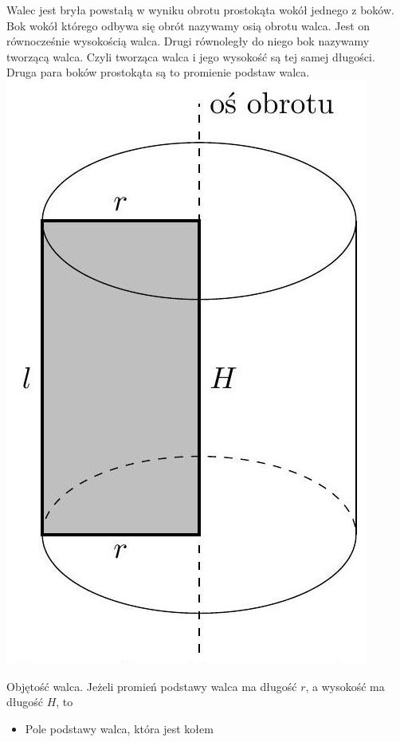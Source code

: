 \documentclass[10pt]{article}
\begin{document}
Walec jest bryła powstałą w wyniku obrotu prostokąta wokół jednego z boków. Bok wokół którego odbywa się obrót nazywamy osią obrotu walca. Jest on równocześnie wysokością walca. Drugi równoległy do niego bok nazywamy tworzącą walca. Czyli tworząca walca i jego wysokość są tej samej długości. Druga para boków prostokąta są to promienie podstaw walca.\\
\includegraphics[max width=\textwidth, center]{2024_11_21_e9b4faa005d5be2cc318g-094}

Objętość walca. Jeżeli promień podstawy walca ma długość \(r\), a wysokość ma długość \(H\), to

\begin{itemize}
  \item Pole podstawy walca, która jest kołem
\end{itemize}
\end{document}
